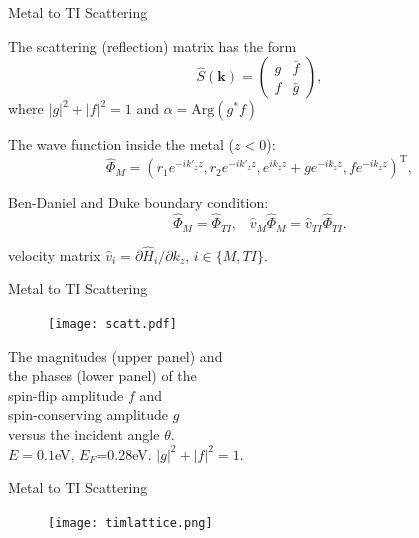 \documentclass[]{beamer}
\def\v#1{\mathbf{#1}}
\begin{document}
\begin{frame}{Metal to TI Scattering}


The scattering (reflection) matrix has the form
\[
\hat{S}(\v{k})=\left(
\begin{array}{ll}
  g & \bar{f}   \\
  f & \bar{g}
  \end{array}
\right),
\]
where $|g|^2+|f|^2=1$ and  $\alpha=\mathrm{Arg}(g^*f)$

The wave function inside the metal ($z<0$):
\[
\hat{\Phi}_M=(r_1e^{-ik'_{z} z},r_2e^{-ik'_{z}z},e^{ik_{z}z}+g e^{-ik_{z}z} ,f e^{-ik_{z}z})^{\mathrm{T}},
\]

Ben-Daniel and Duke boundary condition:
\[
\hat{\Phi}_M=\hat{\Phi}_{TI}, \;\;\; \hat{v}_M \hat{\Phi}_M = \hat{v}_{TI}\hat{\Phi}_{TI}.
\]

velocity matrix $\hat{v}_{i}=\partial \hat{H}_i/\partial k_z$, $i\in \{M, TI\}$. 


\end{frame}




\begin{frame}{Metal to TI Scattering}
\begin{figure}
\vspace{-50pt}
\texttt{[image: scatt.pdf]}
\end{figure}
The magnitudes (upper panel) and \\ 
the phases (lower panel) of the \\
spin-flip amplitude $f$ and \\
spin-conserving amplitude $g$ \\
versus the incident angle $\theta$. \\
$E=0.1$eV, $E_F$=0.28eV. $|g|^2+|f|^2=1$.

\end{frame} 


\begin{frame}{Metal to TI Scattering}
\begin{figure}
\center
\texttt{[image: timlattice.png]}
\end{figure}
\end{frame}
\end{document}
